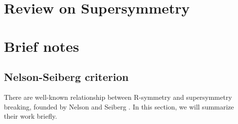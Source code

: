\documentclass[a4paper,pdftex,10pt]{report}
\begin{document}
\maketitle

\tableofcontents

\clearpage
\chapter{Review on Supersymmetry}



















\clearpage
\appendix
\chapter{Brief notes}


\section{Nelson-Seiberg criterion}

There are well-known relationship between R-symmetry and supersymmetry breaking, founded by Nelson and Seiberg \cite{Nelson:1993nf}. In this section, we will summarize their work briefly.
















\clearpage



\nocite{Nelson:1993nf}
\nocite{Martin:1997ns}

\end{document}
